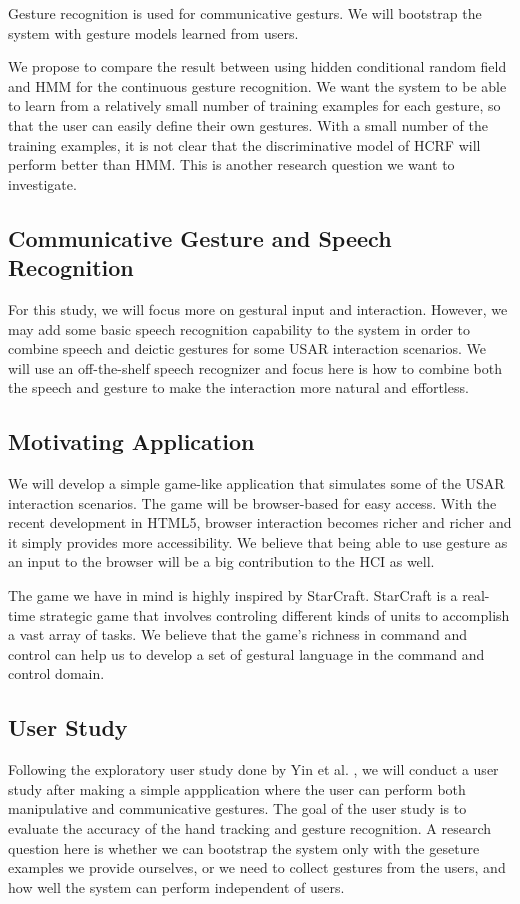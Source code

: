 Gesture recognition is used for communicative
gesturs. We will bootstrap the system with gesture models learned from users.

We propose to compare the result between using hidden conditional random field
and HMM for the continuous gesture recognition. We want the system to be able to
learn from a relatively small number of training examples for each gesture, so
that the user can easily define their own gestures. With a small number of the
training examples, it is not clear that the discriminative model of HCRF will
perform better than HMM. This is another research question we want to
investigate.

\subsection{Communicative Gesture and Speech Recognition} 
For this study, we will focus more on gestural input and interaction. 
However, we may add some basic speech recognition capability to the system in order to combine speech and
deictic gestures for some USAR interaction scenarios. We will use an
off-the-shelf speech recognizer and focus here is how to combine both the speech
and gesture to make the interaction more natural and effortless.

\subsection{Motivating Application}
We will develop a simple game-like application that simulates some of the USAR
interaction scenarios. The game will be browser-based for easy access. With the
recent development in HTML5, browser interaction becomes richer and richer and
it simply provides more accessibility. We believe that being able to use gesture
as an input to the browser will be a big contribution to the HCI as well.

The game we have in mind is highly inspired by StarCraft. StarCraft is a
real-time strategic game that involves controling different kinds of units to
accomplish a vast array of tasks. We believe that the game's richness in command
and control can help us to develop a set of gestural language in the command and
control domain.

\subsection{User Study}\label{sec:userStudy}
Following the exploratory user study done by Yin et al. \cite{yin10}, we will
conduct a user study after making a simple appplication where the user can
perform both manipulative and communicative gestures. The goal of the user study
is to evaluate the accuracy of the hand tracking and gesture recognition. A
research question here is whether we can bootstrap the system only with the
geseture examples we provide ourselves, or we need to collect gestures from the
users, and how well the system can perform independent of users.

